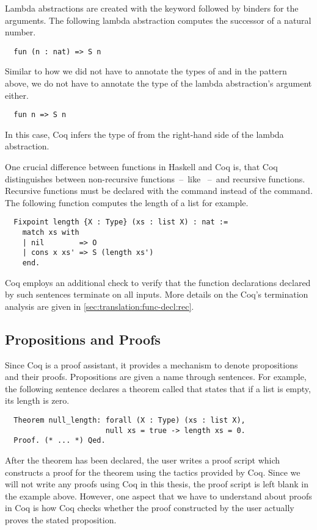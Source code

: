 Lambda abstractions are created with the  keyword followed by binders for the arguments.
The following lambda abstraction computes the successor of a natural number.
\begin{verbatim}
  fun (n : nat) => S n
\end{verbatim}
Similar to how we did not have to annotate the types of  and  in the pattern  above, we do not have to annotate the type of the lambda abstraction's argument either.
\begin{verbatim}
  fun n => S n
\end{verbatim}
In this case, Coq infers the type of  from the right-hand side of the lambda abstraction.

One crucial difference between functions in Haskell and Coq is, that Coq distinguishes between non-recursive functions~--~like ~--~and recursive functions.
Recursive functions must be declared with the  command instead of the  command.
The following function computes the length of a list for example.
\begin{verbatim}
  Fixpoint length {X : Type} (xs : list X) : nat :=
    match xs with
    | nil        => O
    | cons x xs' => S (length xs')
    end.
\end{verbatim}
Coq employs an additional check to verify that the function declarations declared by such  sentences terminate on all inputs.
More details on the Coq's termination analysis are given in \autoref{sec:translation:func-decl:rec}.

\subsection{Propositions and Proofs} \label{sec:preliminaries:coq:theorems}
Since Coq is a proof assistant, it provides a mechanism to denote propositions and their proofs.
Propositions are given a name through  sentences.
For example, the following sentence declares a theorem called  that states that if a list is empty, its length is zero.
\begin{verbatim}
  Theorem null_length: forall (X : Type) (xs : list X),
                       null xs = true -> length xs = 0.
  Proof. (* ... *) Qed.
\end{verbatim}
After the theorem has been declared, the user writes a proof script which constructs a proof for the theorem using the tactics provided by Coq.
Since we will not write any proofs using Coq in this thesis, the proof script is left blank in the example above.
However, one aspect that we have to understand about proofs in Coq is how Coq checks whether the proof constructed by the user actually proves the stated proposition.

